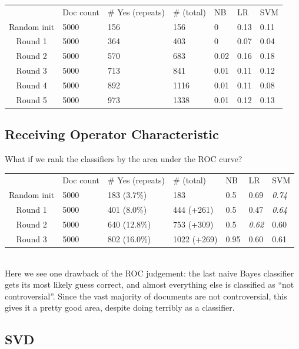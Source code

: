 \documentclass[11pt]{article} %
\begin{document}
\begin{tabular}{|c|*{6}{l|}}
\rowcolor{gray!50} & Doc count & \# Yes (repeats) & \# (total) & NB & LR & SVM \\
Random init & 5000 & 156  & 156 & 0 & 0.13 & 0.11 \\
Round 1 & 5000 & 364 & 403 & 0 & 0.07 & 0.04 \\
Round 2 & 5000 & 570 & 683 & 0.02 & 0.16 & 0.18 \\
Round 3 & 5000 & 713 & 841 & 0.01 & 0.11 & 0.12 \\
Round 4 & 5000 & 892 & 1116 & 0.01 & 0.11 & 0.08 \\
Round 5 & 5000 & 973 & 1338 & 0.01 & 0.12 & 0.13 \\
\end{tabular}


\subsection{Receiving Operator Characteristic}
What if we rank the classifiers by the area under the ROC curve?\\

\begin{tabular}{|c|*{6}{l|}}
\rowcolor{gray!50} & Doc count & \# Yes (repeats) & \# (total) & NB & LR & SVM \\
Random init & 5000 & 183 (3.7\%) & 183 & 0.5 & 0.69 & \emph{0.74} \\
Round 1 & 5000 & 401 (8.0\%) & 444 (+261) & 0.5 & 0.47 & \emph{0.64} \\
Round 2 & 5000 & 640 (12.8\%) & 753 (+309) & 0.5 & \emph{0.62} & 0.60 \\
Round 3 & 5000 & 802 (16.0\%) & 1022 (+269) & 0.95 & 0.60 & 0.61
\end{tabular}\\

Here we see one drawback of the ROC judgement: the last naive Bayes classifier gets its most likely guess correct, and almost everything else is classified as ``not controversial''. Since the vast majority of documents are not controversial, this gives it a pretty good area, despite doing terribly as a classifier.

\subsection{SVD}
\end{document}
